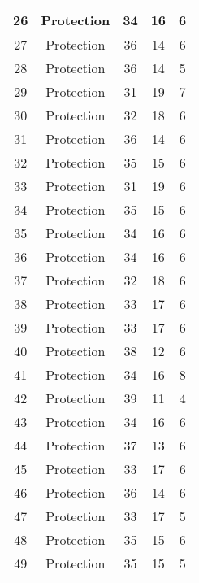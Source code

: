 \documentclass[results.tex]{subfiles}
\begin{document}
\begin{center}
\begin{tabular}{| c || c | c | c | c |}
    \hline
    26 & Protection & 34 & 16 & 6 \\ 
    \hline
    27 & Protection & 36 & 14 & 6 \\ 
    \hline
    28 & Protection & 36 & 14 & 5 \\ 
    \hline
    29 & Protection & 31 & 19 & 7 \\ 
    \hline
    30 & Protection & 32 & 18 & 6 \\ 
    \hline
    31 & Protection & 36 & 14 & 6 \\ 
    \hline
    32 & Protection & 35 & 15 & 6 \\ 
    \hline
    33 & Protection & 31 & 19 & 6 \\ 
    \hline
    34 & Protection & 35 & 15 & 6 \\ 
    \hline
    35 & Protection & 34 & 16 & 6 \\ 
    \hline
    36 & Protection & 34 & 16 & 6 \\ 
    \hline
    37 & Protection & 32 & 18 & 6 \\ 
    \hline
    38 & Protection & 33 & 17 & 6 \\ 
    \hline
    39 & Protection & 33 & 17 & 6 \\ 
    \hline
    40 & Protection & 38 & 12 & 6 \\ 
    \hline
    41 & Protection & 34 & 16 & 8 \\ 
    \hline
    42 & Protection & 39 & 11 & 4 \\ 
    \hline
    43 & Protection & 34 & 16 & 6 \\ 
    \hline
    44 & Protection & 37 & 13 & 6 \\ 
    \hline
    45 & Protection & 33 & 17 & 6 \\ 
    \hline
    46 & Protection & 36 & 14 & 6 \\ 
    \hline
    47 & Protection & 33 & 17 & 5 \\ 
    \hline
    48 & Protection & 35 & 15 & 6 \\ 
    \hline
    49 & Protection & 35 & 15 & 5 \\ 
    \hline   \end{tabular}
\end{center}
\end{document}
